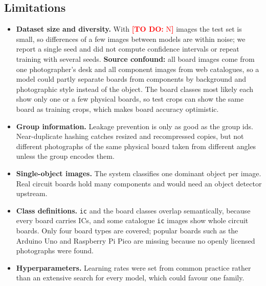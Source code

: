 \documentclass[11pt,a4paper]{article}
\newcommand{\fillin}[1]{\textcolor{red}{\textbf{[TO DO:} #1\textbf{]}}}
\providecommand{\NumImages}{\fillin{N}}
\begin{document}
\subsection{Limitations}\label{sec:limitations}
\begin{itemize}
  \item \textbf{Dataset size and diversity.} With \NumImages{} images the test set is small, so differences of a few images between models are within noise; we report a single seed and did not compute confidence intervals or repeat training with several seeds. \textbf{Source confound:} all board images come from one photographer's desk and all component images from web catalogues, so a model could partly separate boards from components by background and photographic style instead of the object. The board classes most likely each show only one or a few physical boards, so test crops can show the same board as training crops, which makes board accuracy optimistic.
  \item \textbf{Group information.} Leakage prevention is only as good as the group ids. Near-duplicate hashing catches resized and recompressed copies, but not different photographs of the same physical board taken from different angles unless the group encodes them.
  \item \textbf{Single-object images.} The system classifies one dominant object per image. Real circuit boards hold many components and would need an object detector upstream.
  \item \textbf{Class definitions.} \texttt{ic} and the board classes overlap semantically, because every board carries ICs, and some catalogue \texttt{ic} images show whole circuit boards. Only four board types are covered; popular boards such as the Arduino Uno and Raspberry Pi Pico are missing because no openly licensed photographs were found.
  \item \textbf{Hyperparameters.} Learning rates were set from common practice rather than an extensive search for every model, which could favour one family.
\end{itemize}

\end{document}
